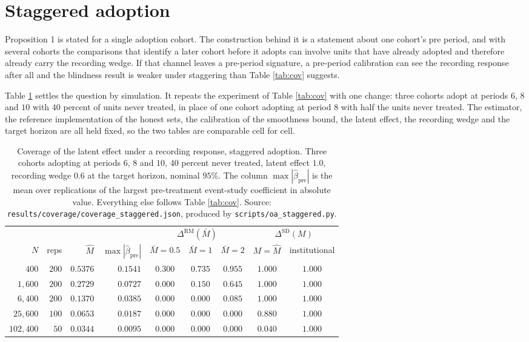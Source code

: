 \documentclass[12pt]{article}
\theoremstyle{definition}
\numberwithin{equation}{section}
\begin{document}
\section{Staggered adoption}
\label{app:staggered}

Proposition 1 is stated for a single adoption cohort. The
construction behind it is a statement about one cohort's pre period, and with
several cohorts the comparisons that identify a later cohort before it adopts
can involve units that have already adopted and therefore already carry the
recording wedge. If that channel leaves a pre-period signature, a pre-period calibration can see the recording response after all and the blindness result is
weaker under staggering than Table \ref{tab:cov} suggests.

Table \ref{tab:stag} settles the question by simulation. It repeats the
experiment of Table \ref{tab:cov} with one change: three cohorts adopt at
periods $6$, $8$ and $10$ with $40$ percent of units never treated, in place of
one cohort adopting at period $8$ with half the units never treated. The
estimator, the reference implementation of the honest sets, the calibration of
the smoothness bound, the latent effect, the recording wedge and the target
horizon are all held fixed, so the two tables are comparable cell for cell.

\begin{table}[t]
\centering
\caption{Coverage of the latent effect under a recording response, staggered
adoption. Three cohorts adopting at periods $6$, $8$ and $10$, $40$ percent
never treated, latent effect $1.0$, recording wedge $0.6$ at the target horizon,
nominal $95\%$. The column $\max|\hat\beta_{\mathrm{pre}}|$ is the mean over
replications of the largest pre-treatment event-study coefficient in absolute
value. Everything else follows Table \ref{tab:cov}. Source:
\texttt{results/coverage/coverage\_staggered.json}, produced by
\texttt{scripts/oa\_staggered.py}.}
\label{tab:stag}
\begin{tabular}{rrrrccccc}
\toprule
& & & & \multicolumn{3}{c}{$\Delta^{\mathrm{RM}}(\bar M)$}
& \multicolumn{2}{c}{$\Delta^{\mathrm{SD}}(M)$} \\
\cmidrule(lr){5-7}\cmidrule(lr){8-9}
$N$ & reps & $\widehat M$ & $\max|\hat\beta_{\mathrm{pre}}|$
& $\bar M = 0.5$ & $\bar M = 1$ & $\bar M = 2$
& $M = \widehat M$ & institutional \\
\midrule
$400$ & $200$ & $0.5376$ & $0.1541$ & $0.300$ & $0.735$ & $0.955$ & $1.000$ & $1.000$ \\
$1{,}600$ & $200$ & $0.2729$ & $0.0727$ & $0.000$ & $0.150$ & $0.645$ & $1.000$ & $1.000$ \\
$6{,}400$ & $200$ & $0.1370$ & $0.0385$ & $0.000$ & $0.000$ & $0.085$ & $1.000$ & $1.000$ \\
$25{,}600$ & $100$ & $0.0653$ & $0.0187$ & $0.000$ & $0.000$ & $0.000$ & $0.880$ & $1.000$ \\
$102{,}400$ & $50$ & $0.0344$ & $0.0095$ & $0.000$ & $0.000$ & $0.000$ & $0.040$ & $1.000$ \\
\bottomrule
\end{tabular}
\end{table}
\end{document}
